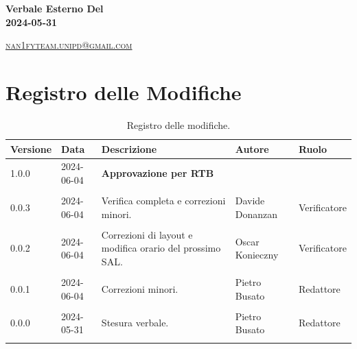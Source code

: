 \documentclass[8pt]{article}
\begin{document}
\begin{titlepage}
\begin{minipage}[t]{0.47\textwidth}
{		}
		\vspace{4mm}\vspace{4mm}
	\end{minipage}
	\vspace{4cm}
	\begin{center}
		\begin{flushright}
			{\fontsize{30pt}{52pt}\selectfont \textbf{Verbale Esterno Del\\2024-05-31\\}} %
		\end{flushright}
		\vspace{3cm}
	\end{center}
	\vspace{8 cm}
	{\small \textsc{\href{mailto: nan1fyteam.unipd@gmail.com}{nan1fyteam.unipd@gmail.com}}}
\end{titlepage}
\pagestyle{mystyle}

\section*{Registro delle Modifiche}
\begin{table}[ht!]	
	\centering
	\begin{tabular}{p{1.2cm} p{2cm} p{6cm} p{3cm} p{2cm}}
		\toprule
		\textbf{Versione}& \textbf{Data} & \textbf{Descrizione} & \textbf{Autore} & \textbf{Ruolo} \\
		\midrule
		1.0.0 & 2024-06-04 & \textbf{Approvazione per RTB} & & \\\\
		0.0.3 & 2024-06-04 & Verifica completa e correzioni minori. & Davide Donanzan & Verificatore \\\\
		0.0.2 & 2024-06-04 & Correzioni di layout e modifica orario del prossimo SAL. & Oscar Konieczny & Verificatore \\\\
		0.0.1 & 2024-06-04 & Correzioni minori. & Pietro Busato & Redattore \\\\ 
		0.0.0 & 2024-05-31 & Stesura verbale.  & Pietro Busato & Redattore \\\\ %
		\bottomrule
	\end{tabular}
	\caption{Registro delle modifiche.}
	\label{table:Registro delle modifiche}
\end{table}
\newpage
\tableofcontents
\clearpage
\newpage
\justifying
\end{document}
